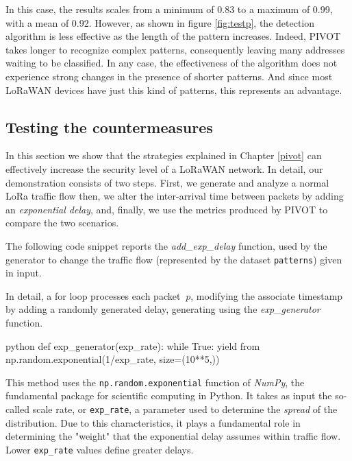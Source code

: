 In this case, the results scales from a minimum of 0.83 to a maximum of 0.99, with a mean of 0.92. However, as shown in figure \ref{fig:testp}, the detection algorithm is less effective as the length of the pattern increases. Indeed, PIVOT takes longer to recognize complex patterns, consequently leaving many addresses waiting to be classified. In any case, the effectiveness of the algorithm does not experience strong changes in the presence of shorter patterns. And since most LoRaWAN devices have just this kind of patterns, this represents an advantage.

\vspace{3mm}


\subsection{Testing the countermeasures}
In this section we show that the strategies explained in Chapter \ref{pivot} can effectively increase the security level of a LoRaWAN network. In detail, our demonstration consists of two steps. First, we generate and analyze a normal LoRa traffic flow then, we alter the inter-arrival time between packets by adding an \textit{exponential delay}, and, finally, we use the metrics produced by PIVOT to compare the two scenarios.

\vspace{3mm}

The following code snippet reports the \textit{add\_exp\_delay} function, used by the generator to change the traffic flow (represented by the dataset \texttt{patterns}) given in input.

\vspace{3mm}

\vspace{3mm}

In detail, a for loop processes each packet \(\ p \), modifying the associate timestamp by adding a randomly generated delay, generating using the \textit{exp\_generator} function.

\vspace{3mm}
\begin{mintedbox}{python}
def exp_generator(exp_rate):
    while True:
        yield from np.random.exponential(1/exp_rate, size=(10**5,))
\end{mintedbox}
\vspace{3mm}

This method uses the \texttt{np.random.exponential} function of \textit{NumPy}, the fundamental package for scientific computing in Python. It takes as input the so-called scale rate, or \texttt{exp\_rate}, a parameter used to determine the \textit{spread} of the distribution. Due to this characteristics, it plays a fundamental role in determining the "weight" that the exponential delay assumes within traffic flow. Lower \texttt{exp\_rate} values define greater delays.

